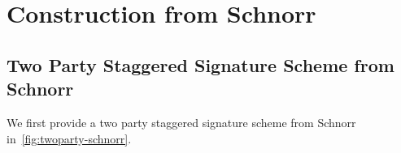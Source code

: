 \section{Construction from Schnorr}
\label{sec:construction-schnorr}

\newcommand{\cnstGroupScalar}{\ensuremath{\mathbb{Z}_p}}
\newcommand{\zkpProve}[2]{\ensuremath{\mathsf{P}_{\textit{NIZK}}(#1; #2)}}
\newcommand{\zkpProofAlice}{\ensuremath{\pi_0}}
\newcommand{\zkpProofBob}{\ensuremath{\pi_1}}
\newcommand{\opEquality}{\ensuremath{=}}
\newcommand{\zkpStatementAlice}{\ensuremath{\textit{stmt}_0}}
\newcommand{\zkpStatementBob}{\ensuremath{\textit{stmt}_1}}
\newcommand{\zkpVerify}[1]{\ensuremath{\mathsf{V}_{\textit{NIZK}}(#1)}}

\newcommand{\varSOneSide}{\ensuremath{\varS_b}}
\newcommand{\varRandOneSide}{\ensuremath{\varRand_b}}
\newcommand{\varSAptOneSide}{\ensuremath{\varS_b}}
\renewcommand{\varNonceAlice}{\ensuremath{k_0}}
\renewcommand{\varNonceBob}{\ensuremath{k_1}}
\renewcommand{\varRandAlice}{\ensuremath{R_0}}
\renewcommand{\varRandBob}{\ensuremath{R_1}}
\renewcommand{\varSAlice}{\ensuremath{s_0}}
\renewcommand{\varSBob}{\ensuremath{s_1}}


\subsection{Two Party Staggered Signature Scheme from Schnorr}

We first provide a two party staggered signature scheme from Schnorr in~\cref{fig:twoparty-schnorr}. 

